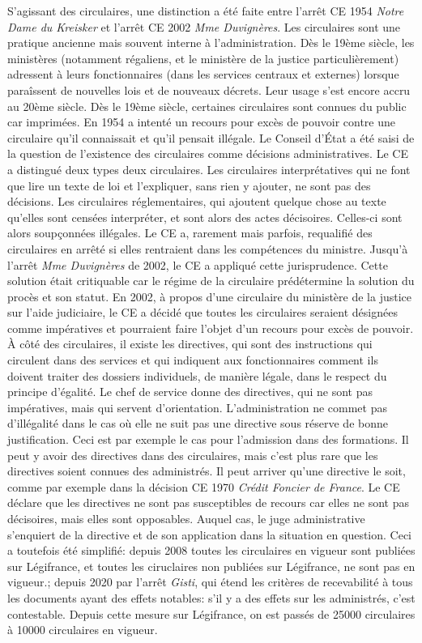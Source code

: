 \documentclass[math]{cours}
\begin{document}
S'agissant des circulaires, une distinction a été faite entre l'arrêt CE 1954 \emph{Notre Dame du Kreisker} et l'arrêt CE 2002 \emph{Mme Duvignères}.
Les circulaires sont une pratique ancienne mais souvent interne à l'administration.
Dès le 19ème siècle, les ministères (notamment régaliens, et le ministère de la justice particulièrement) adressent à leurs fonctionnaires (dans les services centraux et externes) lorsque paraîssent de nouvelles lois et de nouveaux décrets.
Leur usage s'est encore accru au 20ème siècle.
Dès le 19ème siècle, certaines circulaires sont connues du public car imprimées.
En 1954 a intenté un recours pour excès de pouvoir contre une circulaire qu'il connaissait et qu'il pensait illégale.
Le Conseil d'État a été saisi de la question de l'existence des circulaires comme décisions administratives.
Le CE a distingué deux types deux circulaires. Les circulaires interprétatives qui ne font que lire un texte de loi et l'expliquer, sans rien y ajouter, ne sont pas des décisions.
Les circulaires réglementaires, qui ajoutent quelque chose au texte qu'elles sont censées interpréter, et sont alors des actes décisoires.
Celles-ci sont alors soupçonnées illégales.
Le CE a, rarement mais parfois, requalifié des circulaires en arrêté si elles rentraient dans les compétences du ministre.
Jusqu'à l'arrêt \emph{Mme Duvignères} de 2002, le CE a appliqué cette jurisprudence. Cette solution était critiquable car le régime de la circulaire prédétermine la solution du procès et son statut.
En 2002, à propos d'une circulaire du ministère de la justice sur l'aide judiciaire, le CE a décidé que toutes les circulaires seraient désignées comme impératives et pourraient faire l'objet d'un recours pour excès de pouvoir.
À côté des circulaires, il existe les directives, qui sont des instructions qui circulent dans des services et qui indiquent aux fonctionnaires comment ils doivent traiter des dossiers individuels, de manière légale, dans le respect du principe d'égalité.
Le chef de service donne des directives, qui ne sont pas impératives, mais qui servent d'orientation.
L'administration ne commet pas d'illégalité dans le cas où elle ne suit pas une directive sous réserve de bonne justification.
Ceci est par exemple le cas pour l'admission dans des formations.
Il peut y avoir des directives dans des circulaires, mais c'est plus rare que les directives soient connues des administrés.
Il peut arriver qu'une directive le soit, comme par exemple dans la décision CE 1970 \emph{Crédit Foncier de France}.
Le CE déclare que les directives ne sont pas susceptibles de recours car elles ne sont pas décisoires, mais elles sont opposables.
Auquel cas, le juge administrative s'enquiert de la directive et de son application dans la situation en question.
Ceci a toutefois été simplifié: depuis 2008 toutes les circulaires en vigueur sont publiées sur Légifrance, et toutes les ciruclaires non publiées sur Légifrance, ne sont pas en vigueur.; depuis 2020 par l'arrêt \emph{Gisti}, qui étend les critères de recevabilité à tous les documents ayant des effets notables: s'il y a des effets sur les administrés, c'est contestable.
Depuis cette mesure sur Légifrance, on est passés de 25000 circulaires à 10000 circulaires en vigueur.
\end{document}
